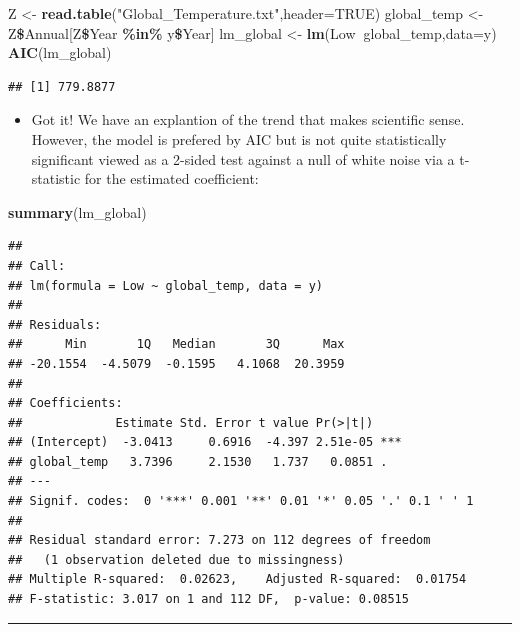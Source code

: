 \documentclass[]{article}
\newenvironment{Shaded}{\begin{snugshade}}{\end{snugshade}}
\newcommand{\KeywordTok}[1]{\textcolor[rgb]{0.13,0.29,0.53}{\textbf{#1}}}
\newcommand{\DataTypeTok}[1]{\textcolor[rgb]{0.13,0.29,0.53}{#1}}
\newcommand{\StringTok}[1]{\textcolor[rgb]{0.31,0.60,0.02}{#1}}
\newcommand{\OtherTok}[1]{\textcolor[rgb]{0.56,0.35,0.01}{#1}}
\newcommand{\OperatorTok}[1]{\textcolor[rgb]{0.81,0.36,0.00}{\textbf{#1}}}
\newcommand{\NormalTok}[1]{#1}
\providecommand{\tightlist}{%
  \setlength{\itemsep}{0pt}\setlength{\parskip}{0pt}}
\begin{document}
\begin{Shaded}
\begin{Highlighting}[]
\NormalTok{Z <-}\StringTok{ }\KeywordTok{read.table}\NormalTok{(}\StringTok{"Global_Temperature.txt"}\NormalTok{,}\DataTypeTok{header=}\OtherTok{TRUE}\NormalTok{)}
\NormalTok{global_temp <-}\StringTok{ }\NormalTok{Z}\OperatorTok{\$}\NormalTok{Annual[Z}\OperatorTok{\$}\NormalTok{Year }\OperatorTok{\%in\%}\StringTok{ }\NormalTok{y}\OperatorTok{\$}\NormalTok{Year]}
\NormalTok{lm_global <-}\StringTok{ }\KeywordTok{lm}\NormalTok{(Low}\OperatorTok{~}\NormalTok{global_temp,}\DataTypeTok{data=}\NormalTok{y)}
\KeywordTok{AIC}\NormalTok{(lm_global)}
\end{Highlighting}
\end{Shaded}

\begin{verbatim}
## [1] 779.8877
\end{verbatim}

\begin{itemize}
\tightlist
\item
  Got it! We have an explantion of the trend that makes scientific
  sense. However, the model is prefered by AIC but is not quite
  statistically significant viewed as a 2-sided test against a null of
  white noise via a t-statistic for the estimated coefficient:
\end{itemize}

\begin{Shaded}
\begin{Highlighting}[]
\KeywordTok{summary}\NormalTok{(lm_global)}
\end{Highlighting}
\end{Shaded}

\begin{verbatim}
## 
## Call:
## lm(formula = Low ~ global_temp, data = y)
## 
## Residuals:
##      Min       1Q   Median       3Q      Max 
## -20.1554  -4.5079  -0.1595   4.1068  20.3959 
## 
## Coefficients:
##             Estimate Std. Error t value Pr(>|t|)    
## (Intercept)  -3.0413     0.6916  -4.397 2.51e-05 ***
## global_temp   3.7396     2.1530   1.737   0.0851 .  
## ---
## Signif. codes:  0 '***' 0.001 '**' 0.01 '*' 0.05 '.' 0.1 ' ' 1
## 
## Residual standard error: 7.273 on 112 degrees of freedom
##   (1 observation deleted due to missingness)
## Multiple R-squared:  0.02623,    Adjusted R-squared:  0.01754 
## F-statistic: 3.017 on 1 and 112 DF,  p-value: 0.08515
\end{verbatim}

\begin{center}\rule{0.5\linewidth}{\linethickness}\end{center}
\end{document}
